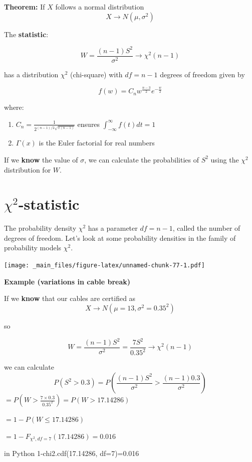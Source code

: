 \documentclass[
]{book}
\providecommand{\tightlist}{%
  \setlength{\itemsep}{0pt}\setlength{\parskip}{0pt}}
\begin{document}
\textbf{Theorem:} If \(X\) follows a normal distribution
\[X \rightarrow N(\mu, \sigma^2)\]

The \textbf{statistic}:

\[W=\frac{(n-1)S^2}{\sigma^2} \rightarrow \chi^2(n-1)\]

has a distribution \(\chi^2\) (chi-square) with \(df=n-1\) degrees of freedom given by

\[f(w)=C_n w^{\frac{n-3}{2}} e^{-\frac{w}{2}}\]

where:

\begin{enumerate}
\def\labelenumi{\arabic{enumi})}
\tightlist
\item
  \(C_n=\frac{1}{2^{(n-1)/2\sqrt{\pi(n-1)}}}\) ensures \(\int_{-\infty}^{\infty} f (t)dt=1\)
\item
  \(\Gamma(x)\) is the Euler factorial for real numbers
\end{enumerate}

If we \textbf{know} the value of \(\sigma\), we can calculate the probabilities of \(S^2\) using the \(\chi^2\) distribution for \(W\).

\hypertarget{chi2-statistic}{%
\section{\texorpdfstring{\(\chi^2\)-statistic}{\textbackslash chi\^{}2-statistic}}\label{chi2-statistic}}

The probability density \(\chi^2\) has a parameter \(df=n-1\), called the number of degrees of freedom. Let's look at some probability densities in the family of probability models \(\chi^2\).

\texttt{[image: \_main\_files/figure-latex/unnamed-chunk-77-1.pdf]}

\textbf{Example (variations in cable break)}

If we \textbf{know} that our cables are certified as
\[X \rightarrow N(\mu=13, \sigma^2=0.35^2)\]

so

\[W=\frac{(n-1)S^2}{\sigma^2}= \frac{7S^2}{0.35^2} \rightarrow \chi^2(n-1)\]

we can calculate \[P(S^2 > 0.3)=P(\frac{(n-1)S^2}{\sigma^2} > \frac{(n-1)0.3}{\sigma^2 } )\]
\(=P(W > \frac{7\times0.3}{0.35^2})=P(W > 17.14286)\)

\(=1-P(W \leq 17.14286)\)

\(= 1- F_{\chi^2,df=7}(17.14286)=0.016\)

in Python
1-chi2.cdf(17.14286, df=7)=0.016
\end{document}

